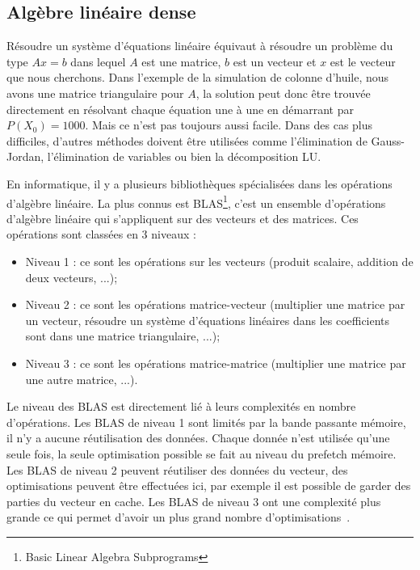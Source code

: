 \subsection{Algèbre linéaire dense}
Résoudre un système d'équations linéaire équivaut à résoudre un problème du type $Ax=b$ dans lequel $A$ est une matrice, $b$ est un vecteur et $x$ est le vecteur que nous cherchons.
%
Dans l'exemple de la simulation de colonne d'huile, nous avons une matrice triangulaire pour $A$, la solution peut donc être trouvée directement en résolvant chaque équation une à une en démarrant par $P(X_0) = 1000$.
%
Mais ce n'est pas toujours aussi facile.
%
Dans des cas plus difficiles, d'autres méthodes doivent être utilisées comme l'élimination de Gauss-Jordan, l'élimination de variables ou bien la décomposition LU.


En informatique, il y a plusieurs bibliothèques spécialisées dans les opérations d'algèbre linéaire.
%
La plus connus est BLAS\footnote{Basic Linear Algebra Subprograms}, c'est un ensemble d'opérations d'algèbre linéaire qui s'appliquent sur des vecteurs et des matrices.
%
Ces opérations sont classées en 3 niveaux :
\begin{itemize}
  \item Niveau 1 : ce sont les opérations sur les vecteurs (produit scalaire, addition de deux vecteurs, ...);
  \item Niveau 2 : ce sont les opérations matrice-vecteur (multiplier une matrice par un vecteur, résoudre un système d'équations linéaires dans les coefficients sont dans une matrice triangulaire, ...);
  \item Niveau 3 : ce sont les opérations matrice-matrice (multiplier une matrice par une autre matrice, ...).
\end{itemize}
%
Le niveau des BLAS est directement lié à leurs complexités en nombre d'opérations.
%
Les BLAS de niveau 1 sont limités par la bande passante mémoire, il n'y a aucune réutilisation des données.
%
Chaque donnée n'est utilisée qu'une seule fois, la seule optimisation possible se fait au niveau du prefetch mémoire.
%
Les BLAS de niveau 2 peuvent réutiliser des données du vecteur, des optimisations peuvent être effectuées ici, par exemple il est possible de garder des parties du vecteur en cache.
%
Les BLAS de niveau 3 ont une complexité plus grande ce qui permet d'avoir un plus grand nombre d'optimisations~\cite{blas3_opt}.

